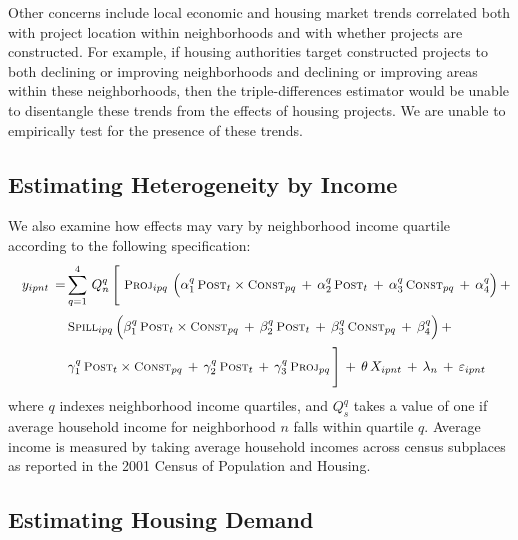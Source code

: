 \documentclass[12pt]{article}
\begin{document}
Other concerns include local economic and housing market trends correlated both with project location within neighborhoods and with whether projects are constructed.  For example, if housing authorities target constructed projects to both declining or improving neighborhoods and declining or improving areas within these neighborhoods, then the triple-differences estimator would be unable to disentangle these trends from the effects of housing projects.  We are unable to empirically test for the presence of these trends.

\subsection{Estimating Heterogeneity by Income}

We also examine how effects may vary by neighborhood income quartile according to the following specification:
\begin{align}\label{eq:mainhet}
\begin{split}
\quad y_{ipnt} \, =& \sum_{q=1}^{4} \, Q_{n}^{q} \, \Bigg[ \,  \,   \textsc{\small Proj}_{ipq} \,\, \Big( \alpha_1^q \, \textsc{\small Post}_{t}\times\textsc{\small Const}_{pq} \, + \, \alpha_2^q \, \textsc{\small Post}_{t} \, + \, \alpha_3^q \, \textsc{\small Const}_{pq}\, +\, \alpha_4^q \Big) \, + \\[.2em]
& \, \textsc{\small Spill}_{ipq} \, \Big( \beta_1^q \, \textsc{\small Post}_{t}\times\textsc{\small Const}_{pq} \, + \, \beta_2^q \, \textsc{\small Post}_{t} \, + \, \beta_3^q \, \textsc{\small Const}_{pq} \, +\, \beta_4^q \Big) \, + \\[.2em]
& \, \gamma_1^q \,  \textsc{\small Post}_{t}\times\textsc{\small Const}_{pq} \, + \, \gamma_2^q \,\textsc{\small Post}_{t} \, + \, \gamma_3^q \,  \textsc{\small Proj}_{pq} \, \Bigg] \, + \, \theta \, X_{ipnt} \, + \, \lambda_n \, + \, \varepsilon_{ipnt} \quad 
\end{split}
\end{align}
\noindent where $q$ indexes neighborhood income quartiles, and $Q_s^q$ takes a value of one if average household income for neighborhood $n$ falls within quartile $q$.  Average income is measured by taking average household incomes across census subplaces as reported in the 2001 Census of Population and Housing.  


\subsection{Estimating Housing Demand}
\end{document}
